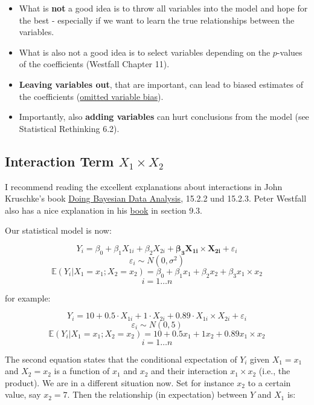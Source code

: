 \documentclass[
]{book}
\providecommand{\tightlist}{%
  \setlength{\itemsep}{0pt}\setlength{\parskip}{0pt}}
\begin{document}
\begin{itemize}
\tightlist
\item
  What is \textbf{not} a good idea is to throw all variables into the model and hope for the best -
  especially if we want to learn the true relationships between the variables.
\item
  What is also not a good idea is to select variables depending on the \(p\)-values of the coefficients (Westfall Chapter 11).
\item
  \textbf{Leaving variables out}, that are important, can lead to biased estimates of the coefficients
  (\href{https://en.wikipedia.org/wiki/Omitted-variable_bias}{omitted variable bias}).
\item
  Importantly, also \textbf{adding variables} can hurt conclusions from the model (see Statistical Rethinking 6.2).
\end{itemize}

\subsection{\texorpdfstring{Interaction Term \(X_1 \times X_2\)}{Interaction Term X\_1 \textbackslash times X\_2}}\label{interaction_term}

I recommend reading the excellent explanations about interactions
in John Kruschke's book \href{https://nyu-cdsc.github.io/learningr/assets/kruschke_bayesian_in_R.pdf}{Doing Bayesian Data Analysis},
15.2.2 und 15.2.3. Peter Westfall also has a nice explanation in his \href{https://www.routledge.com/Understanding-Regression-Analysis-A-Conditional-Distribution-Approach/Westfall-Arias/p/book/9780367493516?srsltid=AfmBOore3O_Ciecl0TTkr9AjPIY1d6OmbQa7o7IAdKpTSkD8s9HkwzD4}{book}
in section 9.3.

Our statistical model is now:

\[ Y_i = \beta_0 + \beta_1 X_{1i} + \beta_2 X_{2i} + \mathbf{\beta_3 X_{1i} \times X_{2i}} + \varepsilon_i\]
\[ \varepsilon_i \sim N(0, \sigma^2)\]
\[ \mathbb{E}(Y_i|X_1 = x_1; X_2 = x_2) = \beta_0 + \beta_1 x_{1} + \beta_2 x_{2} + \beta_3 x_{1} \times x_{2}\]
\[ i = 1 \ldots n\]

for example:

\[ Y_i = 10 + 0.5 \cdot X_{1i} + 1 \cdot X_{2i} + 0.89 \cdot X_{1i} \times X_{2i} + \varepsilon_i\]
\[ \varepsilon_i \sim N(0, 5)\]
\[ \mathbb{E}(Y_i|X_1 = x_1; X_2 = x_2) = 10 + 0.5 x_1 + 1 x_2 + 0.89 x_1 \times x_2\]
\[ i = 1 \ldots n\]

The second equation states that the conditional expectation of \(Y_i\) given \(X_1=x_1\) and \(X_2=x_2\)
is a function of \(x_1\) and \(x_2\) and their interaction \(x_1 \times x_2\) (i.e., the product). We are in a different situation now.
Set for instance \(x_2\) to a certain value, say \(x_2 = 7\). Then the relationship (in expectation)
between \(Y\) and \(X_1\) is:
\end{document}
